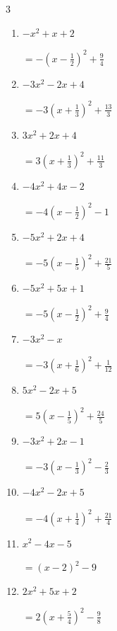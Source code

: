 \begin{multicols}{3}
\begin{enumerate}
  \item $-x^{2}+x+2$

        $\displaystyle =-\left( x-\frac{1}{2}\right)^{2}+\frac{9}{4}$

  \item $-3x^{2}-2x+4$

        $\displaystyle =-3\left( x+\frac{1}{3}\right)^{2}+\frac{13}{3}$

\columnbreak %

  \item $3x^{2}+2x+4$

        $\displaystyle =3\left( x+\frac{1}{3}\right)^{2}+\frac{11}{3}$

  \item $-4x^{2}+4x-2$

        $\displaystyle =-4\left( x-\frac{1}{2}\right)^{2}-1$

  \item $-5x^{2}+2x+4$

        $\displaystyle =-5\left( x-\frac{1}{5}\right)^{2}+\frac{21}{5}$

  \item $-5x^{2}+5x+1$

        $\displaystyle =-5\left( x-\frac{1}{2}\right)^{2}+\frac{9}{4}$

  \item $-3x^{2}-x$

        $\displaystyle =-3\left( x+\frac{1}{6}\right)^{2}+\frac{1}{12}$

\columnbreak %

  \item $5x^{2}-2x+5$

        $\displaystyle =5\left( x-\frac{1}{5}\right)^{2}+\frac{24}{5}$

  \item $-3x^{2}+2x-1$

        $\displaystyle =-3\left( x-\frac{1}{3}\right)^{2}-\frac{2}{3}$

  \item $-4x^{2}-2x+5$

        $\displaystyle =-4\left( x+\frac{1}{4}\right)^{2}+\frac{21}{4}$

  \item $x^{2}-4x-5$

        $\displaystyle =\left( x-2\right)^{2}-9$

  \item $2x^{2}+5x+2$

        $\displaystyle =2\left( x+\frac{5}{4}\right)^{2}-\frac{9}{8}$


\end{enumerate}
\end{multicols}
